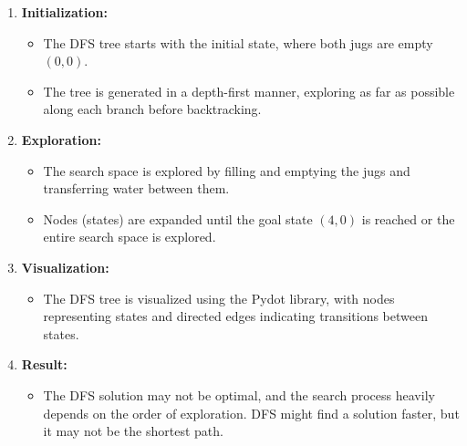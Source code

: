 \documentclass[12pt]{article}
\begin{document}
\begin{enumerate}
    \item \textbf{Initialization:}
        \begin{itemize}
            \item The DFS tree starts with the initial state, where both jugs are empty \((0,0)\).
            \item The tree is generated in a depth-first manner, exploring as far as possible along each branch before backtracking.
        \end{itemize}
    
    \item \textbf{Exploration:}
        \begin{itemize}
            \item The search space is explored by filling and emptying the jugs and transferring water between them.
            \item Nodes (states) are expanded until the goal state \((4,0)\) is reached or the entire search space is explored.
        \end{itemize}
    
    \item \textbf{Visualization:}
        \begin{itemize}
            \item The DFS tree is visualized using the Pydot library, with nodes representing states and directed edges indicating transitions between states.
        \end{itemize}
    
    \item \textbf{Result:}
        \begin{itemize}
            \item The DFS solution may not be optimal, and the search process heavily depends on the order of exploration. DFS might find a solution faster, but it may not be the shortest path.
        \end{itemize}
\end{enumerate}
\end{document}
